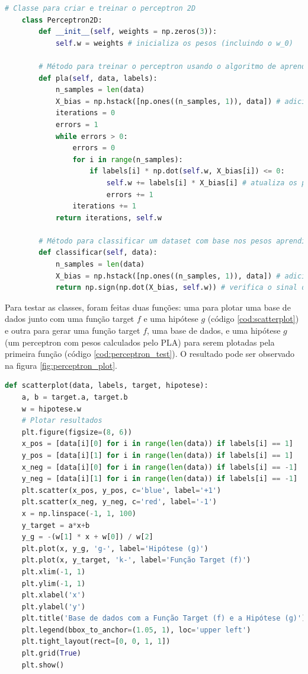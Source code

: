 \begin{lstlisting}[language=Python, caption=Perceptron, label=cod:perceptron]
    # Classe para criar e treinar o perceptron 2D
    class Perceptron2D:
        def __init__(self, weights = np.zeros(3)):
            self.w = weights # inicializa os pesos (incluindo o w_0)
        
        # Método para treinar o perceptron usando o algoritmo de aprendizagem perceptron (PLA)
        def pla(self, data, labels): 
            n_samples = len(data)
            X_bias = np.hstack([np.ones((n_samples, 1)), data]) # adiciona uma coluna de 1s para o X_0 (coordenada artificial)
            iterations = 0
            errors = 1
            while errors > 0:
                errors = 0
                for i in range(n_samples):
                    if labels[i] * np.dot(self.w, X_bias[i]) <= 0:
                        self.w += labels[i] * X_bias[i] # atualiza os pesos
                        errors += 1
                iterations += 1
            return iterations, self.w
        
        # Método para classificar um dataset com base nos pesos aprendidos.
        def classificar(self, data):
            n_samples = len(data)
            X_bias = np.hstack([np.ones((n_samples, 1)), data]) # adiciona uma coluna de 1s para o bias X_0
            return np.sign(np.dot(X_bias, self.w)) # verifica o sinal do produto escalar entre x e w
\end{lstlisting}


Para testar as classes, foram feitas duas funções: uma para plotar uma base de dados junto com uma função target $f$ e uma hipótese $g$ (código \ref{cod:scatterplot}) e outra para gerar uma função target $f$, uma base de dados, e uma hipótese $g$ (um perceptron com pesos calculados pelo PLA) para serem plotadas pela primeira função (código \ref{cod:perceptron_test}). O resultado pode ser observado na figura \ref{fig:perceptron_plot}. 

\begin{lstlisting}[language=Python, caption=Plotagem de dataset com função target (f) e hipótese (g), label=cod:scatterplot]
    def scatterplot(data, labels, target, hipotese):
    a, b = target.a, target.b
    w = hipotese.w
    # Plotar resultados
    plt.figure(figsize=(8, 6))
    x_pos = [data[i][0] for i in range(len(data)) if labels[i] == 1]
    y_pos = [data[i][1] for i in range(len(data)) if labels[i] == 1]
    x_neg = [data[i][0] for i in range(len(data)) if labels[i] == -1]
    y_neg = [data[i][1] for i in range(len(data)) if labels[i] == -1]
    plt.scatter(x_pos, y_pos, c='blue', label='+1')
    plt.scatter(x_neg, y_neg, c='red', label='-1')
    x = np.linspace(-1, 1, 100)
    y_target = a*x+b
    y_g = -(w[1] * x + w[0]) / w[2]
    plt.plot(x, y_g, 'g-', label='Hipótese (g)')
    plt.plot(x, y_target, 'k-', label='Função Target (f)')
    plt.xlim(-1, 1)
    plt.ylim(-1, 1)
    plt.xlabel('x')
    plt.ylabel('y')
    plt.title('Base de dados com a Função Target (f) e a Hipótese (g)')
    plt.legend(bbox_to_anchor=(1.05, 1), loc='upper left')
    plt.tight_layout(rect=[0, 0, 1, 1])
    plt.grid(True)
    plt.show()
\end{lstlisting}

